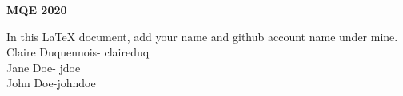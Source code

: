 \documentclass[a4paper, 10pt]{article}
\begin{document}
\begin{center}\bfseries\Huge MQE 2020 \end{center}

\vspace{10mm} %
In this LaTeX document, add your name and github account name under mine.\\

\vspace{10mm} %
\noindent Claire Duquennois- claireduq\\
Jane Doe- jdoe\\
John Doe-johndoe
\end{document}
